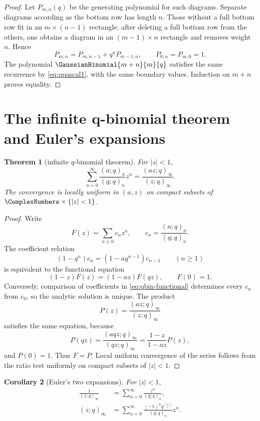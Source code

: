 \documentclass[11pt,oneside]{article}
\newtheorem{theorem}{Theorem}[section]
\newtheorem{corollary}[theorem]{Corollary}
\theoremstyle{definition}
\begin{document}
\begin{proof}
Let $P_{m,n}(q)$ be the generating polynomial for such diagrams. Separate diagrams according as the bottom row has length $n$. Those without a full bottom row fit in an $m\times(n-1)$ rectangle; after deleting a full bottom row from the others, one obtains a diagram in an $(m-1)\times n$ rectangle and removes weight $n$. Hence
\[
 P_{m,n}=P_{m,n-1}+q^nP_{m-1,n},
 \qquad P_{0,n}=P_{m,0}=1.
\]
The polynomial $\GaussianBinomial{m+n}{m}{q}$ satisfies the same recurrence by \eqref{eq:qpascal1}, with the same boundary values. Induction on $m+n$ proves equality.
\end{proof}

\section{The infinite q-binomial theorem and Euler's expansions}

\begin{theorem}[infinite $q$-binomial theorem]\label{thm:q-binomial}
For $|z|<1$,
\begin{equation}\label{eq:q-binomial}
 \sum_{n=0}^{\infty}\frac{(a;q)_n}{(q;q)_n}z^n
 =\frac{(az;q)_\infty}{(z;q)_\infty}.
\end{equation}
The convergence is locally uniform in $(a,z)$ on compact subsets of $\ComplexNumbers\times\{|z|<1\}$.
\end{theorem}

\begin{proof}
Write
\[
 F(z)=\sum_{n\ge0}c_nz^n,
 \qquad c_n=\frac{(a;q)_n}{(q;q)_n}.
\]
The coefficient relation
\[
 (1-q^n)c_n=(1-aq^{n-1})c_{n-1}\qquad(n\ge1)
\]
is equivalent to the functional equation
\begin{equation}\label{eq:qbin-functional}
 (1-z)F(z)=(1-az)F(qz),\qquad F(0)=1.
\end{equation}
Conversely, comparison of coefficients in \eqref{eq:qbin-functional} determines every $c_n$ from $c_0$, so the analytic solution is unique. The product
\[
 P(z)=\frac{(az;q)_\infty}{(z;q)_\infty}
\]
satisfies the same equation, because
\[
 P(qz)=\frac{(aqz;q)_\infty}{(qz;q)_\infty}
 =\frac{1-z}{1-az}P(z),
\]
and $P(0)=1$. Thus $F=P$. Local uniform convergence of the series follows from the ratio test uniformly on compact subsets of $|z|<1$.
\end{proof}

\begin{corollary}[Euler's two expansions]\label{cor:euler-expansions}
For $|z|<1$,
\begin{align}
 \frac1{(z;q)_\infty}&=\sum_{n=0}^{\infty}\frac{z^n}{(q;q)_n},\label{eq:euler-first}\\
 (z;q)_\infty&=\sum_{n=0}^{\infty}
 \frac{(-1)^nq^{\binom n2}}{(q;q)_n}z^n.\label{eq:euler-second}
\end{align}
\end{corollary}
\end{document}
